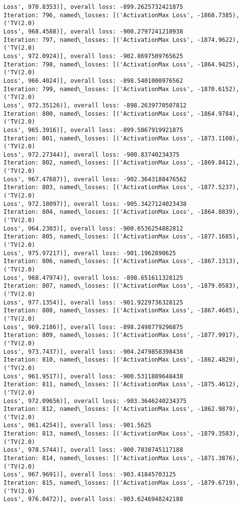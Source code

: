 \documentclass[10pt]{article}
\begin{document}
\begin{Verbatim}[commandchars=\\\{\}]
Loss', 970.8353)], overall loss: -899.2625732421875
Iteration: 796, named\_losses: [('ActivationMax Loss', -1868.7385), ('TV(2.0)
Loss', 968.4588)], overall loss: -900.2797241210938
Iteration: 797, named\_losses: [('ActivationMax Loss', -1874.9622), ('TV(2.0)
Loss', 972.0924)], overall loss: -902.8697509765625
Iteration: 798, named\_losses: [('ActivationMax Loss', -1864.9425), ('TV(2.0)
Loss', 966.4024)], overall loss: -898.5401000976562
Iteration: 799, named\_losses: [('ActivationMax Loss', -1870.6152), ('TV(2.0)
Loss', 972.35126)], overall loss: -898.2639770507812
Iteration: 800, named\_losses: [('ActivationMax Loss', -1864.9784), ('TV(2.0)
Loss', 965.3916)], overall loss: -899.5867919921875
Iteration: 801, named\_losses: [('ActivationMax Loss', -1873.1108), ('TV(2.0)
Loss', 972.27344)], overall loss: -900.83740234375
Iteration: 802, named\_losses: [('ActivationMax Loss', -1869.8412), ('TV(2.0)
Loss', 967.47687)], overall loss: -902.3643188476562
Iteration: 803, named\_losses: [('ActivationMax Loss', -1877.5237), ('TV(2.0)
Loss', 972.18097)], overall loss: -905.3427124023438
Iteration: 804, named\_losses: [('ActivationMax Loss', -1864.8839), ('TV(2.0)
Loss', 964.2303)], overall loss: -900.6536254882812
Iteration: 805, named\_losses: [('ActivationMax Loss', -1877.1685), ('TV(2.0)
Loss', 975.97217)], overall loss: -901.1962890625
Iteration: 806, named\_losses: [('ActivationMax Loss', -1867.1313), ('TV(2.0)
Loss', 968.47974)], overall loss: -898.651611328125
Iteration: 807, named\_losses: [('ActivationMax Loss', -1879.0583), ('TV(2.0)
Loss', 977.1354)], overall loss: -901.9229736328125
Iteration: 808, named\_losses: [('ActivationMax Loss', -1867.4685), ('TV(2.0)
Loss', 969.2186)], overall loss: -898.2498779296875
Iteration: 809, named\_losses: [('ActivationMax Loss', -1877.9917), ('TV(2.0)
Loss', 973.7437)], overall loss: -904.2479858398438
Iteration: 810, named\_losses: [('ActivationMax Loss', -1862.4829), ('TV(2.0)
Loss', 961.9517)], overall loss: -900.5311889648438
Iteration: 811, named\_losses: [('ActivationMax Loss', -1875.4612), ('TV(2.0)
Loss', 972.09656)], overall loss: -903.3646240234375
Iteration: 812, named\_losses: [('ActivationMax Loss', -1862.9879), ('TV(2.0)
Loss', 961.4254)], overall loss: -901.5625
Iteration: 813, named\_losses: [('ActivationMax Loss', -1879.3583), ('TV(2.0)
Loss', 978.5744)], overall loss: -900.7838745117188
Iteration: 814, named\_losses: [('ActivationMax Loss', -1871.3876), ('TV(2.0)
Loss', 967.9691)], overall loss: -903.41845703125
Iteration: 815, named\_losses: [('ActivationMax Loss', -1879.6719), ('TV(2.0)
Loss', 976.0472)], overall loss: -903.6246948242188

\end{Verbatim}
\end{document}
